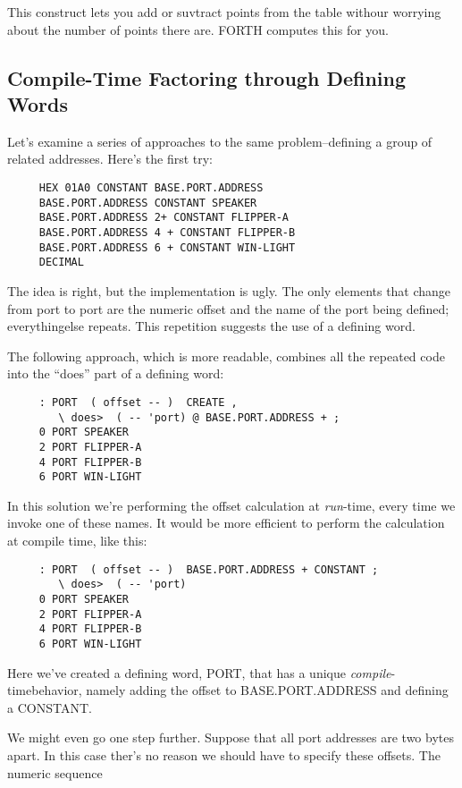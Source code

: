 This construct lets you add or suvtract points from the table withour worrying about the number of points there are. FORTH computes this for you.

\subsection{{Compile-Time Factoring through Defining Words}}

Let's examine a series of approaches to the same problem--defining a group of related addresses. Here's the first try:

\begin{verbatim}
     HEX 01A0 CONSTANT BASE.PORT.ADDRESS
     BASE.PORT.ADDRESS CONSTANT SPEAKER
     BASE.PORT.ADDRESS 2+ CONSTANT FLIPPER-A
     BASE.PORT.ADDRESS 4 + CONSTANT FLIPPER-B
     BASE.PORT.ADDRESS 6 + CONSTANT WIN-LIGHT
     DECIMAL
\end{verbatim}
The idea is right, but the implementation is ugly. The only elements that change from port to port are the numeric offset and the name of the port being defined; everythingelse repeats. This repetition suggests the use of a defining word.

The following approach, which is more readable, combines all the repeated code into the ``does'' part  of a defining word:

\begin{verbatim}
     : PORT  ( offset -- )  CREATE ,
        \ does>  ( -- 'port) @ BASE.PORT.ADDRESS + ;
     0 PORT SPEAKER
     2 PORT FLIPPER-A
     4 PORT FLIPPER-B
     6 PORT WIN-LIGHT
\end{verbatim}
In this solution we're performing the offset calculation at \textit{run}-time, every time we invoke one of these names. It would be more efficient to perform the calculation at compile time, like this:

\begin{verbatim}
     : PORT  ( offset -- )  BASE.PORT.ADDRESS + CONSTANT ;
        \ does>  ( -- 'port)
     0 PORT SPEAKER
     2 PORT FLIPPER-A
     4 PORT FLIPPER-B
     6 PORT WIN-LIGHT
\end{verbatim}
Here we've created a defining word, PORT, that has a unique \textit{compile}-timebehavior, namely adding the offset to BASE.PORT.ADDRESS and defining a CONSTANT.

We might even go one step further. Suppose that all port addresses are two bytes apart. In this case ther's no reason we should have to specify these offsets. The numeric sequence


